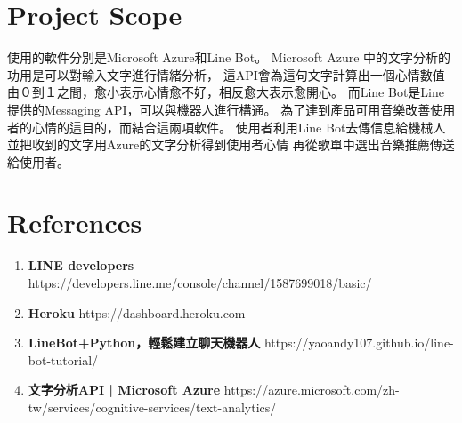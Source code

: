 \documentclass{scrreprt}
\begin{document}
\section{Project Scope}
\begin{CJK}{UTF8}{<font>}
使用的軟件分別是Microsoft Azure和Line Bot。
Microsoft Azure 中的文字分析的功用是可以對輸入文字進行情緒分析，
這API會為這句文字計算出一個心情數值由０到１之間，愈小表示心情愈不好，相反愈大表示愈開心。
而Line Bot是Line提供的Messaging API，可以與機器人進行構通。
為了達到產品可用音樂改善使用者的心情的這目的，而結合這兩項軟件。
使用者利用Line Bot去傳信息給機械人並把收到的文字用Azure的文字分析得到使用者心情
再從歌單中選出音樂推薦傳送給使用者。
\end{CJK}

\section{References}
\begin{CJK}{UTF8}{<font>}
\begin{enumerate} 
	\item \textbf {LINE developers} \newline
	https://developers.line.me/console/channel/1587699018/basic/
	\item  \textbf {Heroku} \newline
	https://dashboard.heroku.com
	\item \textbf {LineBot+Python，輕鬆建立聊天機器人} \newline
	https://yaoandy107.github.io/line-bot-tutorial/  
	\item  \textbf {文字分析API | Microsoft Azure}  \newline
	https://azure.microsoft.com/zh-tw/services/cognitive-services/text-analytics/
\end{enumerate}
\end{CJK}
\end{document}
